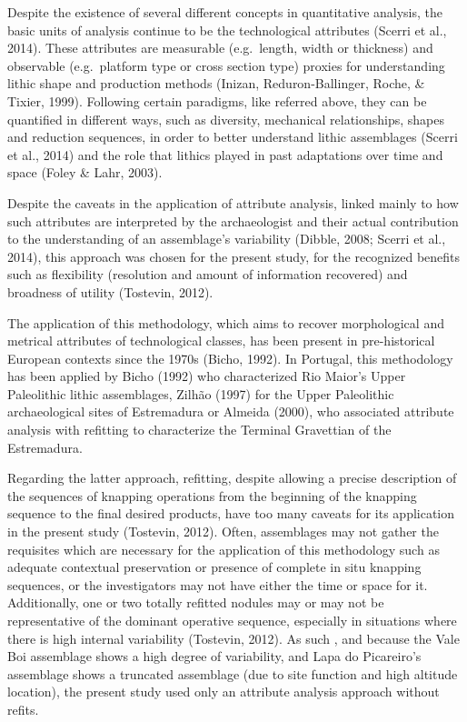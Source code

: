 \documentclass[12pt,twoside]{reedthesis}
\begin{document}
Despite the existence of several different concepts in quantitative analysis, the basic units of analysis continue to be the technological attributes (Scerri et al., 2014). These attributes are measurable (e.g.~length, width or thickness) and observable (e.g.~platform type or cross section type) proxies for understanding lithic shape and production methods (Inizan, Reduron-Ballinger, Roche, \& Tixier, 1999). Following certain paradigms, like referred above, they can be quantified in different ways, such as diversity, mechanical relationships, shapes and reduction sequences, in order to better understand lithic assemblages (Scerri et al., 2014) and the role that lithics played in past adaptations over time and space (Foley \& Lahr, 2003).

Despite the caveats in the application of attribute analysis, linked mainly to how such attributes are interpreted by the archaeologist and their actual contribution to the understanding of an assemblage's variability (Dibble, 2008; Scerri et al., 2014), this approach was chosen for the present study, for the recognized benefits such as flexibility (resolution and amount of information recovered) and broadness of utility (Tostevin, 2012).

The application of this methodology, which aims to recover morphological and metrical attributes of technological classes, has been present in pre-historical European contexts since the 1970s (Bicho, 1992). In Portugal, this methodology has been applied by Bicho (1992) who characterized Rio Maior's Upper Paleolithic lithic assemblages, Zilhão (1997) for the Upper Paleolithic archaeological sites of Estremadura or Almeida (2000), who associated attribute analysis with refitting to characterize the Terminal Gravettian of the Estremadura.

Regarding the latter approach, refitting, despite allowing a precise description of the sequences of knapping operations from the beginning of the knapping sequence to the final desired products, have too many caveats for its application in the present study (Tostevin, 2012). Often, assemblages may not gather the requisites which are necessary for the application of this methodology such as adequate contextual preservation or presence of complete in situ knapping sequences, or the investigators may not have either the time or space for it. Additionally, one or two totally refitted nodules may or may not be representative of the dominant operative sequence, especially in situations where there is high internal variability (Tostevin, 2012). As such , and because the Vale Boi assemblage shows a high degree of variability, and Lapa do Picareiro's assemblage shows a truncated assemblage (due to site function and high altitude location), the present study used only an attribute analysis approach without refits.
\end{document}
